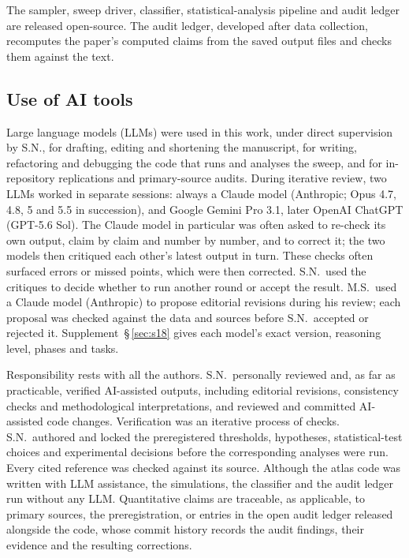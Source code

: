 \documentclass[pdflatex,sn-nature]{sn-jnl}%
\begin{document}
The sampler, sweep driver, classifier, statistical-analysis pipeline and audit ledger are released open-source. The audit ledger, developed after data collection, recomputes the paper's computed claims from the saved output files and checks them against the text.

\subsection{Use of AI tools}\label{sec:methods-ai}

\noindent Large language models (LLMs) were used in this work, under direct supervision by S.N., for drafting, editing and shortening the manuscript, for writing, refactoring and debugging the code that runs and analyses the sweep, and for in-repository replications and primary-source audits. During iterative review, two LLMs worked in separate sessions: always a Claude model (Anthropic; Opus 4.7, 4.8, 5 and 5.5 in succession), and Google Gemini Pro 3.1, later OpenAI ChatGPT (GPT-5.6 Sol). The Claude model in particular was often asked to re-check its own output, claim by claim and number by number, and to correct it; the two models then critiqued each other's latest output in turn. These checks often surfaced errors or missed points, which were then corrected. S.N.\ used the critiques to decide whether to run another round or accept the result. M.S.\ used a Claude model (Anthropic) to propose editorial revisions during his review; each proposal was checked against the data and sources before S.N.\ accepted or rejected it. Supplement~\S\,\ref{sec:s18} gives each model's exact version, reasoning level, phases and tasks.

Responsibility rests with all the authors. S.N.\ personally reviewed and, as far as practicable, verified AI-assisted outputs, including editorial revisions, consistency checks and methodological interpretations, and reviewed and committed AI-assisted code changes. Verification was an iterative process of checks. S.N.\ authored and locked the preregistered thresholds, hypotheses, statistical-test choices and experimental decisions before the corresponding analyses were run. Every cited reference was checked against its source. Although the atlas code was written with LLM assistance, the simulations, the classifier and the audit ledger run without any LLM. Quantitative claims are traceable, as applicable, to primary sources, the preregistration, or entries in the open audit ledger released alongside the code, whose commit history records the audit findings, their evidence and the resulting corrections.
\end{document}
